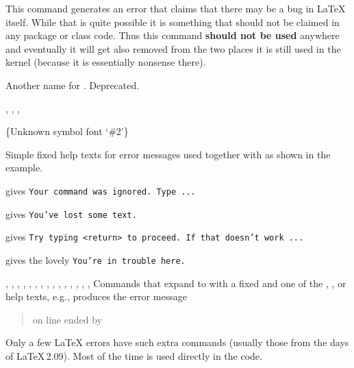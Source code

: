 \documentclass{l3in2edoc}
\begin{document}
\begin{function}
  {
    \@latexbug
  }
  This command generates an error that claims that there may be a bug
  in \LaTeX{} itself. While that is quite possible it is something
  that should not be claimed in any package or class code. Thus this
  command \textbf{should not be used} anywhere and eventually it will
  get also removed from the two places it is still used in the kernel
  (because it is essentially nonsense there).

\end{function}




\begin{function}
  {
    \@latexerr
  }
  Another name for . Deprecated.

\end{function}



\begin{function}[]
  {
    \@eha,
    \@ehb,
    \@ehc,
    \@ehd
  }
  \begin{syntax}
    \{Unknown symbol font `\#2'\}
  \end{syntax}
  Simple fixed help texts for error messages used together with  as shown in the example.

   gives \texttt{Your command was ignored. Type ...}

   gives \texttt{You've lost some text. }

   gives \texttt{Try typing <return> to proceed. If that doesn't work ...}

   gives the lovely \texttt{You're in trouble here. }
\end{function}




\begin{function}[]
  { \@badend,
    \@badlinearg,
    \@badmath,
    \@badpoptabs,
    \@badtab,
    \@ctrerr,
    \@fltovf,
    \@nocnterr,
    \@nodocument,
    \@noitemerr,
    \@nolnerr,
    \@notdefinable,
    \@notprerr,
    \@parmoderr,
    \@toodeep,
    \@LRmoderr
  }
%
  Commands that expand to  with a
  fixed  and one of the , , or
   help texts, e.g.,  produces the error message
  \begin{quote}\ttfamily
     on line  ended by 
  \end{quote}

  Only a few \LaTeX{} errors have such extra commands (usually those
  from the days of \LaTeX\,2.09). Most of the time  is
  used directly in the code.

\end{function}
\end{document}
